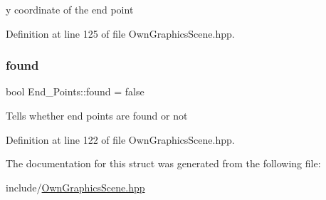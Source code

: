 y coordinate of the end point 

Definition at line 125 of file Own\+Graphics\+Scene.\+hpp.

\mbox{\label{structEnd__Points_aff9dd173210b07bb087d70cf5ec9439f}} 
\subsubsection{\texorpdfstring{found}{found}}
{\footnotesize\ttfamily bool End\+\_\+\+Points\+::found = false}

Tells whether end points are found or not 

Definition at line 122 of file Own\+Graphics\+Scene.\+hpp.



The documentation for this struct was generated from the following file\+:\begin{DoxyCompactItemize}
\item 
include/\mbox{\hyperlink{OwnGraphicsScene_8hpp}{Own\+Graphics\+Scene.\+hpp}}\end{DoxyCompactItemize}
